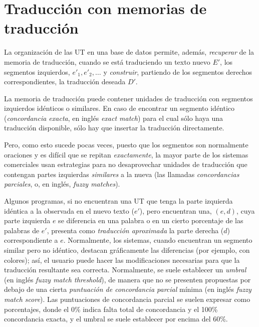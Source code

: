 \section{Traducción con memorias de traducción} 

La organización de las UT en una base de datos permite, además, \emph{recuperar} de la memoria de traducción, cuando se está traduciendo un texto nuevo $E'$, los segmentos izquierdos, $e'_1, e'_2, \ldots$ y \emph{construir}, partiendo de los segmentos derechos correspondientes, la traducción deseada $D'$. 

La memoria de traducción puede contener unidades de traducción con segmentos izquierdos idénticos o similares. En caso de encontrar un segmento idéntico (\emph{concordancia exacta}, en inglés \emph{exact match}) para el cual sólo haya una traducción disponible, sólo hay que insertar la traducción directamente. 

Pero, como esto sucede pocas veces, puesto que los segmentos son normalmente oraciones y es difícil que se repitan \emph{exactamente}, la mayor parte de los sistemas comerciales usan estrategias para no desaprovechar unidades de traducción que contengan partes izquierdas \emph{similares} a la nueva (las llamadas \emph{concordancias parciales}, o, en inglés, \emph{fuzzy matches}). 

Algunos programas, si no encuentran una UT que tenga la parte izquierda idéntica a la observada en el nuevo texto ($e'$), pero encuentran una, $(e,d)$, cuya parte izquierda $e$ se diferencia en una palabra o en un cierto porcentaje de las palabras de $e'$, presenta como \emph{traducción aproximada} la parte derecha ($d$) correspondiente a $e$. Normalmente, los sistemas, cuando encuentran un segmento similar pero no idéntico, destacan gráficamente las diferencias (por ejemplo, con colores); así, el usuario puede hacer las modificaciones necesarias para que la traducción resultante sea correcta. Normalmente, se suele establecer un \emph{umbral} (en inglés \emph{fuzzy match threshold}), de manera que no se presenten propuestas por debajo de una cierta \emph{puntuación de concordancia parcial} mínima (en inglés \emph{fuzzy match score}). Las puntuaciones de concordancia parcial se suelen expresar como porcentajes, donde el 0\% indica falta total de concordancia y el 100\% concordancia exacta, y el umbral se suele establecer por encima del 60\%. 

